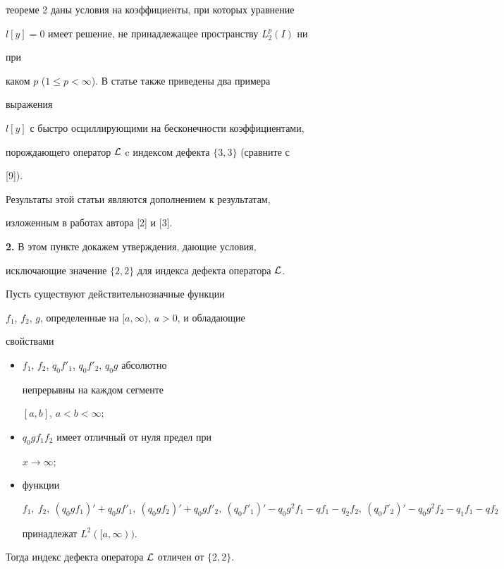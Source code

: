 теореме 2 даны условия на коэффициенты, при которых уравнение 


$l[y]=0$ имеет решение, не принадлежащее пространству $L^p_2(I)$ ни 


при 


каком $p$ ($1\le p<\infty$). В статье также приведены два примера 


выражения 


$l[y]$ с быстро осциллирующими на бесконечности коэффициентами, 


порождающего оператор $\cal L$ c индексом дефекта $\{3,3\}$ (сравните с 


[9]). 


 


Результаты этой статьи являются дополнением к результатам, 


изложенным в работах автора [2] и [3]. 


\medskip 


 


{\bf 2.} В этом пункте докажем утверждения, дающие условия, 


исключающие значение $\{2,2\}$ для индекса дефекта оператора $\cal L$. 


 


\begin{thm} 


Пусть существуют действительнозначные функции 


$f_1$, $f_2$, $g$, определенные на $[a,\infty)$, $a>0$, и обладающие 


свойствами 


\begin{itemize} 


\item[1)] $f_1$, $f_2$, $q_0f'_1$, $q_0f'_2$, $q_0g$ абсолютно 


непрерывны на каждом сегменте 


$[a,b]$, $a<b<\infty;$ 


\item[2)] $q_0g f_1f_2$ имеет отличный от нуля предел при 


$x\to\infty;$ 


\item[3)] функции 


$$ 


f_1,\ f_2,\ (q_0g f_1)'+q_0g f'_1, 


\ (q_0g f_2)'+q_0g f'_2,\ (q_0f'_1)'-q_0g^2f_1- 


q f_1-q_2f_2,\ (q_0f'_2)'-q_0g^2f_2-q_1f_1-q f_2 


$$ 


принадлежат $L^2([a,\infty))$. 


\end{itemize} 





Тогда индекс дефекта оператора $\cal L$ отличен от $\{2,2\}$. 


\end{thm} 


